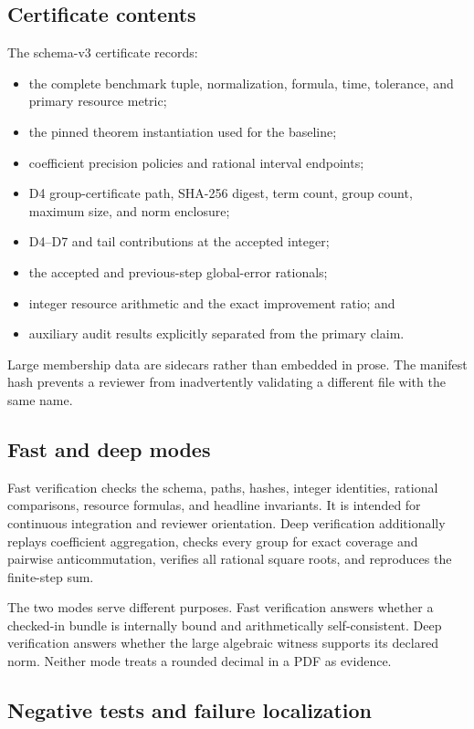 \subsection{Certificate contents}

The schema-v3 certificate records:
\begin{itemize}
  \item the complete benchmark tuple, normalization, formula, time, tolerance,
        and primary resource metric;
  \item the pinned theorem instantiation used for the baseline;
  \item coefficient precision policies and rational interval endpoints;
  \item D4 group-certificate path, SHA-256 digest, term count, group count,
        maximum size, and norm enclosure;
  \item D4--D7 and tail contributions at the accepted integer;
  \item the accepted and previous-step global-error rationals;
  \item integer resource arithmetic and the exact improvement ratio; and
  \item auxiliary audit results explicitly separated from the primary claim.
\end{itemize}
Large membership data are sidecars rather than embedded in prose.  The
manifest hash prevents a reviewer from inadvertently validating a different
file with the same name.

\subsection{Fast and deep modes}

Fast verification checks the schema, paths, hashes, integer identities,
rational comparisons, resource formulas, and headline invariants.  It is
intended for continuous integration and reviewer orientation.  Deep
verification additionally replays coefficient aggregation, checks every group
for exact coverage and pairwise anticommutation, verifies all rational square
roots, and reproduces the finite-step sum.

The two modes serve different purposes.  Fast verification answers whether a
checked-in bundle is internally bound and arithmetically self-consistent.
Deep verification answers whether the large algebraic witness supports its
declared norm.  Neither mode treats a rounded decimal in a PDF as evidence.

\subsection{Negative tests and failure localization}

